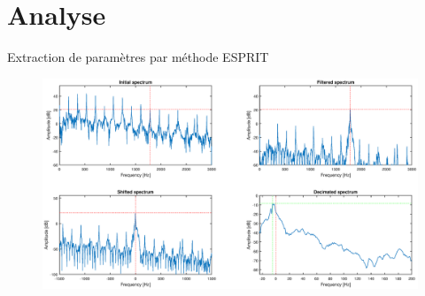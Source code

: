 \section{Analyse}
\begin{frame}{Extraction de paramètres par méthode ESPRIT}

\begin{figure}[hpbt]
\centering
\includegraphics[width=\linewidth]{figures/dedicasse-theis.eps}
\label{pre_proc}
\end{figure}

\end{frame}
